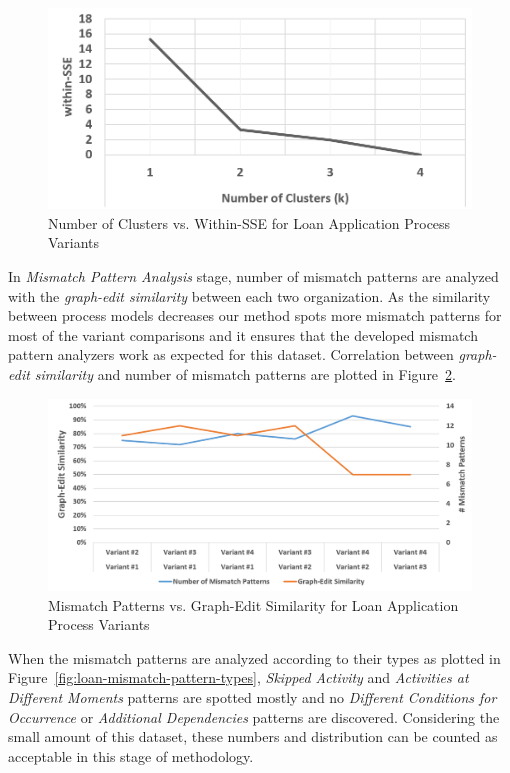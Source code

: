 \begin{figure}
	\centering
	\includegraphics[width=.7\textwidth]{5_results_discussions/loan-application-process/cluster-sse-plot}
	\caption{Number of Clusters vs. Within-SSE for Loan Application Process Variants}
  \label{fig:loan-cluster-sse-plot}
\end{figure}
In \textit{Mismatch Pattern Analysis} stage, number of mismatch patterns are analyzed with the \textit{graph-edit similarity} between each two organization. As the similarity between process models decreases our method spots more mismatch patterns for most of the variant comparisons and it ensures that the developed mismatch pattern analyzers work as expected for this dataset. Correlation between \textit{graph-edit similarity} and number of mismatch patterns are plotted in Figure~\ref{fig:loan-mismatch-pattern-analysis-results}.
\begin{figure}
	\centering
	\includegraphics[width=\textwidth]{5_results_discussions/loan-application-process/mismatch-pattern-analysis-results}
	\caption{Mismatch Patterns vs. Graph-Edit Similarity for Loan Application Process Variants}
  \label{fig:loan-mismatch-pattern-analysis-results}
\end{figure}
When the mismatch patterns are analyzed according to their types as plotted in Figure~\ref{fig:loan-mismatch-pattern-types}, \textit{Skipped Activity} and \textit{Activities at Different Moments} patterns are spotted mostly and no \textit{Different Conditions for Occurrence} or \textit{Additional Dependencies} patterns are discovered. Considering the small amount of this dataset, these numbers and distribution can be counted as acceptable in this stage of methodology.
